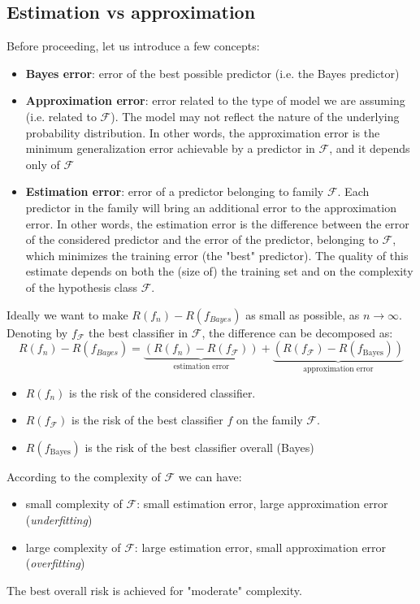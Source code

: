 \subsection{Estimation vs approximation}
Before proceeding, let us introduce a few concepts:
\begin{itemize}
	\item \textbf{Bayes error}: error of the best possible predictor (i.e. the Bayes predictor)
	\item \textbf{Approximation error}: error related to the type of model we are assuming (i.e. related to $\mathcal{F}$). The model may not reflect the nature of the underlying probability distribution. In other words, the approximation error is the minimum generalization error achievable by a predictor in $\mathcal{F}$, and it depends only of $\mathcal{F}$
	\item \textbf{Estimation error}: error of a predictor belonging to family $\mathcal{F}$. Each predictor in the family will bring an additional error to the approximation error. In other words, the estimation error is the difference between the error of the considered predictor and the error of the predictor, belonging to $\mathcal{F}$, which minimizes the training error (the "best" predictor). The quality of this estimate depends on both the (size of) the training set and on the complexity of the hypothesis class $\mathcal{F}$.
\end{itemize}

Ideally we want to make $R(f_n) - R(f_{Bayes})$ as small as possible, as $n \rightarrow \infty$. Denoting by $f_{\mathcal{ F }}$ the best classifier in $\mathcal{ F }$, the difference can be decomposed as:
$$R \left( f _ { n } \right) - R \left( f _ { B a y e s } \right) = \underbrace{\left( R \left( f _ { n } \right) - R \left( f _ { \mathcal { F } } \right) \right)}_{\text{estimation error}} + \underbrace{\left( R \left( f _ { \mathcal { F } } \right) - R \left( f _ { \text {Bayes} } \right) \right)}_{\text{approximation error}}$$

\begin{itemize}
	\item $R(f_n)$ is the risk of the considered classifier.
	\item $R(f_\mathcal{ F })$ is the risk of the best classifier $f$ on the family $\mathcal{ F }$.
	\item $R \left( f _ { \text {Bayes} } \right)$ is the risk of the best classifier overall (Bayes)
\end{itemize}
According to the complexity of $\mathcal{ F }$ we can have:
\begin{itemize}
	\item small complexity of $\mathcal{ F }$: small estimation error, large approximation error (\textit{underfitting})
	\item large complexity of $\mathcal{ F }$: large estimation error, small approximation error (\textit{overfitting})
\end{itemize}
The best overall risk is achieved for "moderate" complexity.

